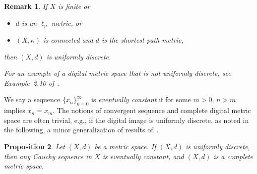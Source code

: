 \documentclass{article}
\newtheorem{thm}{Theorem}
\newtheorem{prop}[thm]{Proposition}
\newtheorem{remarks}[thm]{Remark}
\numberwithin{thm}{section}
\newcommand{\adj}{\leftrightarrow}
\begin{document}
\begin{remarks}
\label{unifDiscrete}
If $X$ is finite or  
\begin{itemize}
\item {\rm \cite{Bx19-3}}
$d$ is an $\ell_p$ metric, or
\item $(X,\kappa)$ is connected and $d$ is 
the shortest path metric,
\end{itemize}
then $(X,d)$ is uniformly discrete.

For an example of a digital metric space
that is not uniformly discrete, see
Example~2.10 of~{\rm \cite{Bx20}}.
\end{remarks}

We say a sequence $\{x_n\}_{n=0}^{\infty}$ is 
{\em eventually constant} if for some $m>0$, 
$n>m$ implies $x_n=x_m$.
The notions of convergent sequence and complete digital metric space are often trivial, 
e.g., if the digital image is uniformly 
discrete, as noted in the following, a minor 
generalization of results 
of~\cite{HanBan,BxSt19}.

\begin{prop}
\label{eventuallyConst}
{\rm \cite{Bx20}}
Let $(X,d)$ be a metric space. 
If $(X,d)$ is uniformly discrete,
then any Cauchy sequence in $X$
is eventually constant, and $(X,d)$ is a complete metric space.
\end{prop}

\end{document}
